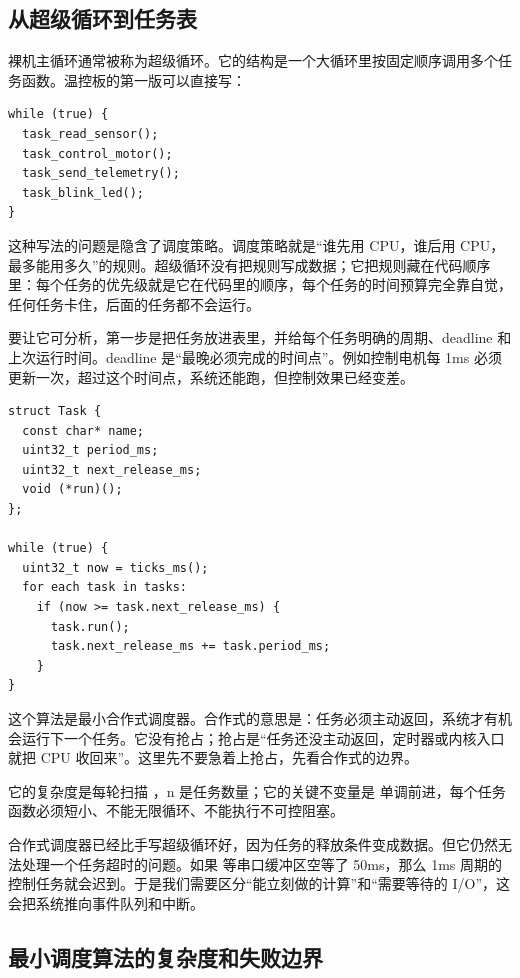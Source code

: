 \subsection{从超级循环到任务表}

裸机主循环通常被称为超级循环。它的结构是一个大循环里按固定顺序调用多个任务函数。温控板的第一版可以直接写：

\begin{lstlisting}
while (true) {
  task_read_sensor();
  task_control_motor();
  task_send_telemetry();
  task_blink_led();
}
\end{lstlisting}

这种写法的问题是隐含了调度策略。调度策略就是“谁先用 CPU，谁后用 CPU，最多能用多久”的规则。超级循环没有把规则写成数据；它把规则藏在代码顺序里：每个任务的优先级就是它在代码里的顺序，每个任务的时间预算完全靠自觉，任何任务卡住，后面的任务都不会运行。

要让它可分析，第一步是把任务放进表里，并给每个任务明确的周期、deadline 和上次运行时间。deadline 是“最晚必须完成的时间点”。例如控制电机每 1ms 必须更新一次，超过这个时间点，系统还能跑，但控制效果已经变差。

\begin{lstlisting}
struct Task {
  const char* name;
  uint32_t period_ms;
  uint32_t next_release_ms;
  void (*run)();
};

while (true) {
  uint32_t now = ticks_ms();
  for each task in tasks:
    if (now >= task.next_release_ms) {
      task.run();
      task.next_release_ms += task.period_ms;
    }
}
\end{lstlisting}

这个算法是最小合作式调度器。合作式的意思是：任务必须主动返回，系统才有机会运行下一个任务。它没有抢占；抢占是“任务还没主动返回，定时器或内核入口就把 CPU 收回来”。这里先不要急着上抢占，先看合作式的边界。

它的复杂度是每轮扫描 ，n 是任务数量；它的关键不变量是  单调前进，每个任务函数必须短小、不能无限循环、不能执行不可控阻塞。

合作式调度器已经比手写超级循环好，因为任务的释放条件变成数据。但它仍然无法处理一个任务超时的问题。如果  等串口缓冲区空等了 50ms，那么 1ms 周期的控制任务就会迟到。于是我们需要区分“能立刻做的计算”和“需要等待的 I/O”，这会把系统推向事件队列和中断。

\subsection{最小调度算法的复杂度和失败边界}

